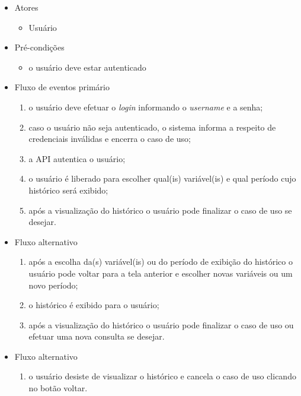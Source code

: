 \begin{itemize}
    \item Atores
    \begin{itemize}
        \item Usuário
    \end{itemize}

    \item Pré-condições
    \begin{itemize}
        \item o usuário deve estar autenticado
    \end{itemize}

    \item Fluxo de eventos primário
    \begin{enumerate}
        \item o usuário deve efetuar o \textit{login} informando o \textit{username} e a senha;
        \item caso o usuário não seja autenticado, o sistema informa a respeito de credenciais inválidas e encerra o caso de uso;
        \item a API autentica o usuário;
        \item o usuário é liberado para escolher qual(is) variável(is) e qual período cujo histórico será exibido;
        \item após a visualização do histórico o usuário pode finalizar o caso de uso se desejar.
    \end{enumerate}

    \item Fluxo alternativo
    \begin{enumerate}
        \item após a escolha da(s) variável(is) ou do período de exibição do histórico o usuário pode voltar para a tela anterior e escolher novas variáveis ou um novo período;
        \item o histórico é exibido para o usuário;
        \item após a visualização do histórico o usuário pode finalizar o caso de uso ou efetuar uma nova consulta se desejar.
    \end{enumerate}

    \item Fluxo alternativo
    \begin{enumerate}
        \item o usuário desiste de visualizar o histórico e cancela o caso de uso clicando no botão voltar.
    \end{enumerate}
\end{itemize}

